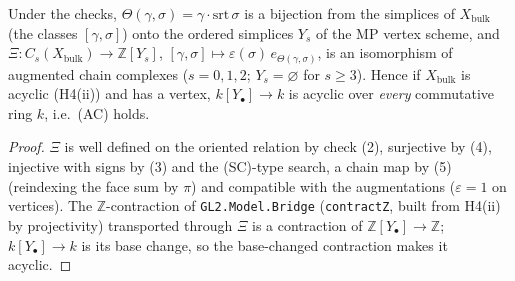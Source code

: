 \begin{theorem}[The sign bridge: ordered chains $=$ \texttt{XBulk.chains}]\label{thm:mp-ac-bridge}
  \leanok
  Under the checks, $\Theta(\gamma,\sigma)=\gamma\cdot\mathrm{srt}\,\sigma$ is a bijection from the simplices of $X_{\mathrm{bulk}}$ (the
  classes $[\gamma,\sigma]$) onto the ordered simplices $Y_s$ of the MP vertex scheme, and
  $\Xi\colon C_s(X_{\mathrm{bulk}})\to\mathbb Z[Y_s]$, $[\gamma,\sigma]\mapsto\varepsilon(\sigma)\,e_{\Theta(\gamma,\sigma)}$, is an
  isomorphism of augmented chain complexes ($s=0,1,2$; $Y_s=\varnothing$ for $s\ge3$).  Hence if $X_{\mathrm{bulk}}$ is acyclic
  (H4(ii)) and has a vertex, $k[Y_\bullet]\to k$ is acyclic over \emph{every} commutative ring $k$, i.e.\ (AC) holds.
\end{theorem}
\begin{proof}
  \leanok
  $\Xi$ is well defined on the oriented relation by check (2), surjective by (4), injective with signs by (3) and the (SC)-type
  search, a chain map by (5) (reindexing the face sum by $\pi$) and compatible with the augmentations ($\varepsilon=1$ on vertices).
  The $\mathbb Z$-contraction of \texttt{GL2.Model.Bridge} (\texttt{contractZ}, built from H4(ii) by projectivity) transported through
  $\Xi$ is a contraction of $\mathbb Z[Y_\bullet]\to\mathbb Z$; $k[Y_\bullet]\to k$ is its base change, so the base-changed
  contraction makes it acyclic.
\end{proof}

